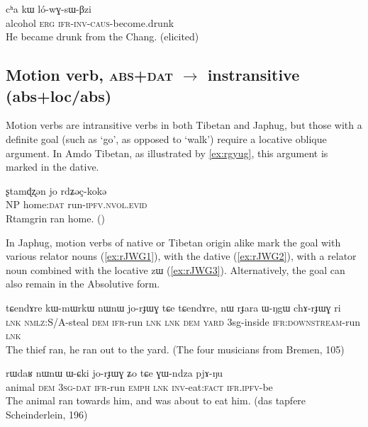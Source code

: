 \documentclass[oldfontcommands,oneside,a4paper,11pt]{article}
\newcommand{\ipa}[1]{{\phon \mbox{#1}}} %
\begin{document}
\begin{exe}
\ex \label{ex:lowGsWBzi}
\gll
\ipa{cʰa} 	\ipa{kɯ} 	\ipa{ló-wɣ-sɯ-βzi} \\ 
alcohol \textsc{erg} \textsc{ifr-inv-caus}-become.drunk \\
\glt He became drunk from the Chang. (elicited)
\end{exe}


\subsection{Motion verb, \textsc{abs+dat} $\rightarrow$ instransitive (abs+loc/abs)}  
Motion verbs are intransitive verbs in both Tibetan and Japhug, but those with a definite goal (such as `go', as opposed to `walk') require a locative oblique argument. In Amdo Tibetan, as illustrated by \ref{ex:rgyug}, this argument is marked in the dative.

\begin{exe}
\ex \label{ex:rgyug}
\gll
\ipa{ʂtamɖʐən} 	\ipa{jo} \ipa{rdʑəç-kokə} 	 \\
NP home:\textsc{dat} run-\textsc{ipfv.nvol.evid} \\
\glt Rtamgrin ran home. (\citealt[80:125]{haller04themchen})
\end{exe}

In Japhug, motion verbs of native or Tibetan origin alike mark the goal with various relator nouns (\ref{ex:rJWG1}), with the dative (\ref{ex:rJWG2}), with a relator noun combined with the locative \ipa{zɯ} (\ref{ex:rJWG3}). Alternatively, the goal can also remain in the Absolutive form. 

\begin{exe}
\ex \label{ex:rJWG1}
\gll
\ipa{tɕendɤre}  	\ipa{kɯ-mɯrkɯ}  	\ipa{nɯnɯ}  	\ipa{jo-rɟɯɣ}  	\ipa{tɕe}  	\ipa{tɕendɤre,}  	\ipa{nɯ}  	\ipa{rɟara}  	\ipa{ɯ-ŋgɯ}  	\ipa{chɤ-rɟɯɣ}  	\ipa{ri}  \\
\textsc{lnk} \textsc{nmlz}:S/A-steal \textsc{dem} \textsc{ifr}-run \textsc{lnk} \textsc{lnk} \textsc{dem} \textsc{yard} 3sg-inside \textsc{ifr:downstream}-run \textsc{lnk} \\
\glt The thief ran, he ran out to the yard. (The four musicians from Bremen, 105)
\end{exe}

\begin{exe}
\ex \label{ex:rJWG2}
\gll
\ipa{rɯdaʁ}  	\ipa{nɯnɯ}  	\ipa{ɯ-ɕki}  	\ipa{jo-rɟɯɣ}  	\ipa{ʑo}  	\ipa{tɕe}  	\ipa{ɣɯ-ndza}  	\ipa{pjɤ-ŋu}  \\
animal \textsc{dem} \textsc{3sg-dat} \textsc{ifr}-run \textsc{emph} \textsc{lnk} \textsc{inv}-eat:\textsc{fact} \textsc{ifr.ipfv}-be \\
\glt The animal ran towards him, and was about to eat him. (das tapfere Scheinderlein, 196)
\end{exe}
\end{document}
